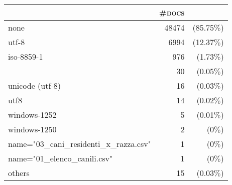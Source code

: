 \begin{tabular}{lrr} 
 \toprule 
 & \textsc{\#docs} & \\ 
 \midrule 
none&48474 &(85.75$\%$)\\ 
  utf-8&6994 &(12.37$\%$)\\ 
  iso-8859-1&976 &(1.73$\%$)\\ 
  &30 &(0.05$\%$)\\ 
  unicode (utf-8)&16 &(0.03$\%$)\\ 
  utf8&14 &(0.02$\%$)\\ 
  windows-1252&5 &(0.01$\%$)\\ 
  windows-1250&2 &(0$\%$)\\ 
  name="03\_cani\_residenti\_x\_razza.csv"&1 &(0$\%$)\\ 
  name="01\_elenco\_canili.csv"&1 &(0$\%$)\\ 
  \bottomrule 
others&15 &(0.03$\%$)\\ 
  \bottomrule 
 \end{tabular}